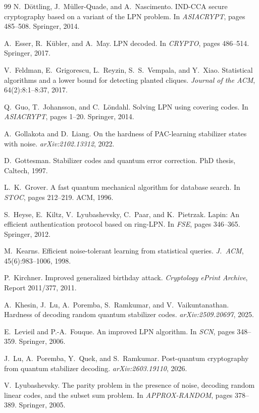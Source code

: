 \documentclass[11pt,a4paper]{article}
\theoremstyle{plain}
\theoremstyle{definition}
\begin{document}
\begin{thebibliography}{99}
N.~D\"ottling, J.~M\"uller-Quade, and A.~Nascimento.
IND-CCA secure cryptography based on a variant of the LPN problem.
In \emph{ASIACRYPT}, pages 485--508. Springer, 2014.

A.~Esser, R.~K\"ubler, and A.~May.
LPN decoded.
In \emph{CRYPTO}, pages 486--514. Springer, 2017.

V.~Feldman, E.~Grigorescu, L.~Reyzin, S.~S.~Vempala, and Y.~Xiao.
Statistical algorithms and a lower bound for detecting planted cliques.
\emph{Journal of the ACM}, 64(2):8:1--8:37, 2017.

Q.~Guo, T.~Johansson, and C.~L\"ondahl.
Solving LPN using covering codes.
In \emph{ASIACRYPT}, pages 1--20. Springer, 2014.

A.~Gollakota and D.~Liang.
On the hardness of PAC-learning stabilizer states with noise.
\emph{arXiv:2102.13312}, 2022.

D.~Gottesman.
Stabilizer codes and quantum error correction.
PhD thesis, Caltech, 1997.

L.~K.~Grover.
A fast quantum mechanical algorithm for database search.
In \emph{STOC}, pages 212--219. ACM, 1996.

S.~Heyse, E.~Kiltz, V.~Lyubashevsky, C.~Paar, and K.~Pietrzak.
Lapin: An efficient authentication protocol based on ring-LPN.
In \emph{FSE}, pages 346--365. Springer, 2012.

M.~Kearns.
Efficient noise-tolerant learning from statistical queries.
\emph{J.\ ACM}, 45(6):983--1006, 1998.

P.~Kirchner.
Improved generalized birthday attack.
\emph{Cryptology ePrint Archive}, Report 2011/377, 2011.

A.~Khesin, J.~Lu, A.~Poremba, S.~Ramkumar, and V.~Vaikuntanathan.
Hardness of decoding random quantum stabilizer codes.
\emph{arXiv:2509.20697}, 2025.

E.~Levieil and P.-A.~Fouque.
An improved LPN algorithm.
In \emph{SCN}, pages 348--359. Springer, 2006.

J.~Lu, A.~Poremba, Y.~Quek, and S.~Ramkumar.
Post-quantum cryptography from quantum stabilizer decoding.
\emph{arXiv:2603.19110}, 2026.

V.~Lyubashevsky.
The parity problem in the presence of noise, decoding random linear codes, and the subset sum problem.
In \emph{APPROX-RANDOM}, pages 378--389. Springer, 2005.


\end{thebibliography}
\end{document}
